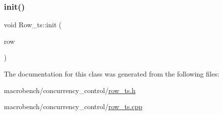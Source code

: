 \subsubsection{\texorpdfstring{init()}{init()}}
{\footnotesize\ttfamily void Row\+\_\+ts\+::init (\begin{DoxyParamCaption}\item[{\hyperlink{classrow__t}{row\+\_\+t} $\ast$}]{row }\end{DoxyParamCaption})}



The documentation for this class was generated from the following files\+:\begin{DoxyCompactItemize}
\item 
macrobench/concurrency\+\_\+control/\hyperlink{row__ts_8h}{row\+\_\+ts.\+h}\item 
macrobench/concurrency\+\_\+control/\hyperlink{row__ts_8cpp}{row\+\_\+ts.\+cpp}\end{DoxyCompactItemize}
